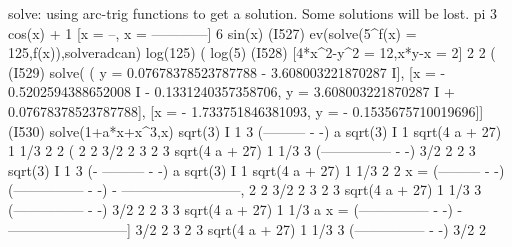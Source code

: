 \documentclass[a4paper,11pt,oneside,enabledeprecatedfontcommands]{scrbook}
\newenvironment{eulernotebook}{}{}
\begin{document}
\begin{eulernotebook}
\begin{euleroutput}
solve: using arc-trig functions to get a solution.
Some solutions will be lost.
                                          pi      3 cos(x) + 1
                                     [x = --, x = ------------]
                                          6          sin(x)
(I527) ev(solve(5^f(x) = 125,f(x)),solveradcan)
                                                         log(125)
(%
                                                          log(5)
(I528) [4*x^2-y^2 = 12,x*y-x = 2]
                                        2    2
(%
(I529) solve(%
(%
y = 0.07678378523787788 - 3.608003221870287 I], [x = - 0.5202594388652008 I - 0.1331240357358706, 
y = 3.608003221870287 I + 0.07678378523787788], [x = - 1.733751846381093, y = - 0.1535675710019696]]
(I530) solve(1+a*x+x^3,x)
                                                               sqrt(3) I   1
                                        3                     (--------- - -) a
                sqrt(3) I   1   sqrt(4 a  + 27)   1 1/3            2       2
(%
                    2       2          3/2        2                  3
                                    2 3                      sqrt(4 a  + 27)   1 1/3
                                                          3 (--------------- - -)
                                                                    3/2        2
                                                                 2 3
                                                     sqrt(3) I   1
                             3                    (- --------- - -) a
     sqrt(3) I   1   sqrt(4 a  + 27)   1 1/3             2       2
x = (--------- - -) (--------------- - -)    - --------------------------, 
         2       2          3/2        2                  3
                         2 3                      sqrt(4 a  + 27)   1 1/3
                                               3 (--------------- - -)
                                                         3/2        2
                                                      2 3
             3
     sqrt(4 a  + 27)   1 1/3               a
x = (--------------- - -)    - --------------------------]
            3/2        2                  3
         2 3                      sqrt(4 a  + 27)   1 1/3
                               3 (--------------- - -)
                                         3/2        2

\end{euleroutput}
\end{eulernotebook}
\end{document}
